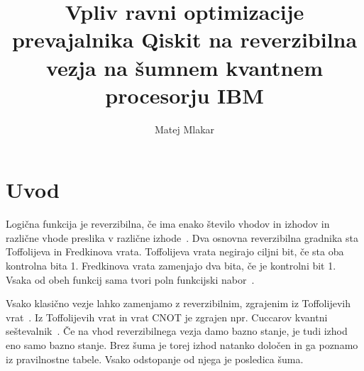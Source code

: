 \documentclass[graybox, envcountchap]{svmult}
\begin{document}

\graphicspath{{img/}}   %

\title{Vpliv ravni optimizacije prevajalnika Qiskit na reverzibilna vezja na šumnem kvantnem procesorju IBM}
\author{Matej Mlakar}
\maketitle



\section{Uvod}
\label{g10:sec:uvod}

Logična funkcija je reverzibilna,
če ima enako število vhodov in izhodov
in različne vhode preslika v različne izhode~\cite{reversible:mraz}.
Dva osnovna reverzibilna gradnika
sta Toffolijeva in Fredkinova vrata.
Toffolijeva vrata negirajo ciljni bit,
če sta oba kontrolna bita 1.
Fredkinova vrata zamenjajo dva bita,
če je kontrolni bit 1.
Vsaka od obeh funkcij sama tvori
poln funkcijski nabor~\cite{reversible:mraz}.

Vsako klasično vezje lahko zamenjamo z reverzibilnim,
zgrajenim iz Toffolijevih vrat~\cite{nielsen2010}.
Iz Toffolijevih vrat in vrat CNOT
je zgrajen npr. Cuccarov kvantni seštevalnik~\cite{g10:cuccaro2004}.
Če na vhod reverzibilnega vezja damo bazno stanje,
je tudi izhod eno samo bazno stanje.
Brez šuma je torej izhod natanko določen
in ga poznamo iz pravilnostne tabele.
Vsako odstopanje od njega je posledica šuma.
\end{document}
